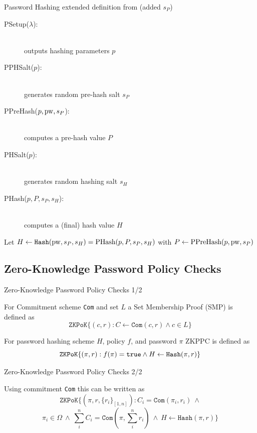 \documentclass[notes,xcolor=dvipsnames]{beamer}
\begin{document}
\begin{frame}{Password Hashing}
  extended definition from \cite{Benhamouda13} (added $s_P$)
  \begin{description}
    \item[PSetup($\lambda$):] \hfill\\ outputs hashing parameters $p$
    \item[PPHSalt($p$):] \hfill\\	generates random pre-hash salt $s_P$
    \item[PPreHash($p, \mathrm{pw}, s_P$):] \hfill\\	computes a pre-hash value $P$
    \item[PHSalt($p$):] \hfill\\ generates random hashing salt $s_H$
    \item[PHash($p, P, s_P, s_H$):]	\hfill\\ computes a (final) hash value $H$
  \end{description}
  Let $H\gets\mathtt{Hash}(\mathrm{pw}, s_P, s_H)=\text{PHash}(p, P, s_P, s_H)$ with $P\gets\text{PPreHash}(p, \mathrm{pw}, s_P)$
\end{frame}

\subsection[ZKPPC]{Zero-Knowledge Password Policy Checks}

\begin{frame}{Zero-Knowledge Password Policy Checks 1/2}
  
  \begin{definition}\label{def:smp}
  For Commitment scheme \texttt{Com} and set $L$ a Set Membership Proof (SMP) is defined as
  \[
    \mathtt{ZKPoK}\{(c, r): C\gets\mathtt{Com}(c, r) \wedge c\in L\}
  \]
  \end{definition}
  
  \begin{definition}\label{def:zkppc}
  For password hashing scheme $H$, policy $f$, and password $\pi$ ZKPPC is defined as
  \[
    \mathtt{ZKPoK}\{(\pi, r): f(\pi)=\mathtt{true} \wedge H\gets\mathtt{Hash}(\pi, r)\}
  \]
  \end{definition}
\end{frame}

\begin{frame}{Zero-Knowledge Password Policy Checks 2/2}
  
  Using commitment \texttt{Com} this can be written as
  \[
    \mathtt{ZKPoK}\{(\pi, r, \{r_i\}_{[1,n]}): C_i=\mathtt{Com}(\pi_i, r_i) ~ \wedge 
  \]
  \[
    \pi_i\in\Omega ~ \wedge ~ \sum_i^n C_i=\mathtt{Com}(\pi, \sum_i^n r_i) ~ \wedge ~ H\gets\mathtt{Hash}(\pi, r)\}
  \]
  
\end{frame}
\end{document}
